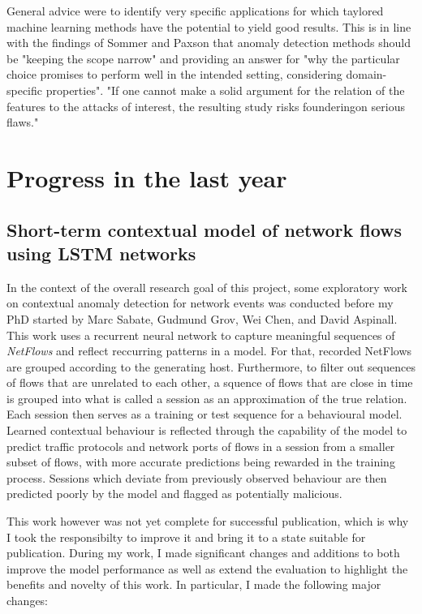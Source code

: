 \documentclass[a4paper,12pt,twoside]{article}
\begin{document}
General advice were to identify very specific applications for which taylored machine learning methods have the potential to yield good results. This is in line with the findings of Sommer and Paxson \cite{sommer_outside_2010} that anomaly detection methods should be "keeping the scope narrow" and providing an answer for "why the particular choice promises to perform well in the intended setting, considering domain-specific properties". "If one cannot make a solid argument for the relation of the features to the attacks of interest, the resulting study risks founderingon serious flaws."




\section{Progress in the last year}

\subsection{Short-term contextual model of network flows using LSTM networks}\label{Sec:Short-term}

In the context of the overall research goal of this project, some exploratory work on contextual anomaly detection for network events was conducted before my PhD started by Marc Sabate, Gudmund Grov, Wei Chen, and David Aspinall. 
This work uses a recurrent neural network to capture meaningful sequences of \textit{NetFlows} and reflect reccurring patterns in a model. For that, recorded NetFlows are grouped according to the generating host. Furthermore, to filter out sequences of flows that are unrelated to each other, a squence of flows that are close in time is grouped into what is called a session as an approximation of the true relation. Each session then serves as a training or test sequence for a behavioural model. Learned contextual behaviour is reflected through the capability of the model to predict traffic protocols and network ports of flows in a session from a smaller subset of flows, with more accurate predictions being rewarded in the training process. Sessions which deviate from previously observed behaviour are then predicted poorly by the model and flagged as potentially malicious.

This work however was not yet complete for successful publication, which is why I took the responsibilty to improve it and bring it to a state suitable for publication. During my work, I made significant changes and additions to both improve the model performance as well as extend the evaluation to highlight the benefits and novelty of this work. 
In particular, I made the following major changes:
\end{document}
